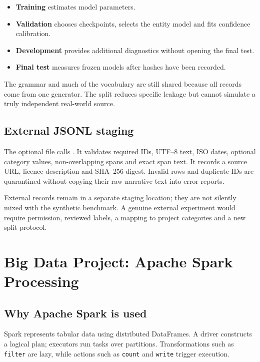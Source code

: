 \documentclass[12pt,a4paper]{report}
\newcommand{\code}[1]{\texttt{#1}}
\begin{document}
\begin{itemize}
  \item \textbf{Training} estimates model parameters.
  \item \textbf{Validation} chooses checkpoints, selects the entity model and fits confidence calibration.
  \item \textbf{Development} provides additional diagnostics without opening the final test.
  \item \textbf{Final test} measures frozen models after hashes have been recorded.
\end{itemize}

The grammar and much of the vocabulary are still shared because all records come from one generator. The split reduces specific leakage but cannot simulate a truly independent real-world source.

\section{External JSONL staging}

The optional file  calls . It validates required IDs, UTF--8 text, ISO dates, optional category values, non-overlapping spans and exact span text. It records a source URL, licence description and SHA--256 digest. Invalid rows and duplicate IDs are quarantined without copying their raw narrative text into error reports.

External records remain in a separate staging location; they are not silently mixed with the synthetic benchmark. A genuine external experiment would require permission, reviewed labels, a mapping to project categories and a new split protocol.

\chapter{Big Data Project: Apache Spark Processing}

\section{Why Apache Spark is used}

Spark represents tabular data using distributed DataFrames. A driver constructs a logical plan; executors run tasks over partitions. Transformations such as \code{filter} are lazy, while actions such as \code{count} and \code{write} trigger execution.
\end{document}
